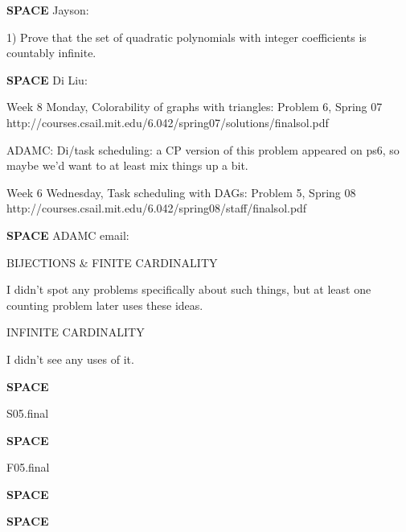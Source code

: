 \documentclass[quiz]{mcs}
\renewcommand{\examspace}{\textbf{SPACE}}
\begin{document}

\examspace
Jayson:

1) Prove that the set of quadratic polynomials with integer
coefficients is countably infinite.

\examspace
Di Liu:

Week 8 Monday, Colorability of graphs with triangles: Problem 6, Spring 07
http://courses.csail.mit.edu/6.042/spring07/solutions/finalsol.pdf

ADAMC: Di/task scheduling: a CP version of this problem appeared on
ps6, so maybe we'd want to at least mix things up a bit.

Week 6 Wednesday, Task scheduling with DAGs: Problem 5, Spring 08
http://courses.csail.mit.edu/6.042/spring08/staff/finalsol.pdf

\examspace
ADAMC email:

BIJECTIONS \& FINITE CARDINALITY

I didn't spot any problems specifically about such things, but at
least one counting problem later uses these ideas.

INFINITE CARDINALITY

I didn't see any uses of it.

\examspace
\begin{editingnotes}S05.final\end{editingnotes}



\examspace
\begin{editingnotes}F05.final\end{editingnotes}


\examspace
{}

\examspace
{}
\end{document}
